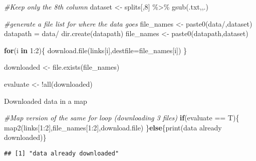 \documentclass[
]{book}
\newenvironment{Shaded}{\begin{snugshade}}{\end{snugshade}}
\newcommand{\AttributeTok}[1]{\textcolor[rgb]{0.77,0.63,0.00}{#1}}
\newcommand{\CommentTok}[1]{\textcolor[rgb]{0.56,0.35,0.01}{\textit{#1}}}
\newcommand{\ControlFlowTok}[1]{\textcolor[rgb]{0.13,0.29,0.53}{\textbf{#1}}}
\newcommand{\DecValTok}[1]{\textcolor[rgb]{0.00,0.00,0.81}{#1}}
\newcommand{\FunctionTok}[1]{\textcolor[rgb]{0.00,0.00,0.00}{#1}}
\newcommand{\NormalTok}[1]{#1}
\newcommand{\OtherTok}[1]{\textcolor[rgb]{0.56,0.35,0.01}{#1}}
\newcommand{\SpecialCharTok}[1]{\textcolor[rgb]{0.00,0.00,0.00}{#1}}
\newcommand{\StringTok}[1]{\textcolor[rgb]{0.31,0.60,0.02}{#1}}
\begin{document}
\begin{Shaded}
\begin{Highlighting}[]
\CommentTok{\#Keep only the 8th column}
\NormalTok{dataset }\OtherTok{\textless{}{-}}\NormalTok{ splits[,}\DecValTok{8}\NormalTok{] }\SpecialCharTok{\%\textgreater{}\%}
  \FunctionTok{gsub}\NormalTok{(}\StringTok{\textquotesingle{}.txt\textquotesingle{}}\NormalTok{,}\StringTok{\textquotesingle{}\textquotesingle{}}\NormalTok{,.)}

\CommentTok{\#generate a file list for where the data goes}
\NormalTok{file\_names }\OtherTok{\textless{}{-}} \FunctionTok{paste0}\NormalTok{(}\StringTok{\textquotesingle{}data/\textquotesingle{}}\NormalTok{,dataset)}
\NormalTok{datapath }\OtherTok{=} \StringTok{\textquotesingle{}data/\textquotesingle{}}
\FunctionTok{dir.create}\NormalTok{(datapath)}
\NormalTok{file\_names }\OtherTok{\textless{}{-}} \FunctionTok{paste0}\NormalTok{(datapath,dataset)}

\ControlFlowTok{for}\NormalTok{(i }\ControlFlowTok{in} \DecValTok{1}\SpecialCharTok{:}\DecValTok{2}\NormalTok{)\{}
  \FunctionTok{download.file}\NormalTok{(links[i],}\AttributeTok{destfile=}\NormalTok{file\_names[i])}
\NormalTok{\}}

\NormalTok{downloaded }\OtherTok{\textless{}{-}} \FunctionTok{file.exists}\NormalTok{(file\_names)}

\NormalTok{evaluate }\OtherTok{\textless{}{-}} \SpecialCharTok{!}\FunctionTok{all}\NormalTok{(downloaded)}
\end{Highlighting}
\end{Shaded}

Downloaded data in a map

\begin{Shaded}
\begin{Highlighting}[]
\CommentTok{\#Map version of the same for loop (downloading 3 files)}
\ControlFlowTok{if}\NormalTok{(evaluate }\SpecialCharTok{==}\NormalTok{ T)\{}
  \FunctionTok{map2}\NormalTok{(links[}\DecValTok{1}\SpecialCharTok{:}\DecValTok{2}\NormalTok{],file\_names[}\DecValTok{1}\SpecialCharTok{:}\DecValTok{2}\NormalTok{],download.file)}
\NormalTok{\}}\ControlFlowTok{else}\NormalTok{\{}\FunctionTok{print}\NormalTok{(}\StringTok{\textquotesingle{}data already downloaded\textquotesingle{}}\NormalTok{)\}}
\end{Highlighting}
\end{Shaded}

\begin{verbatim}
## [1] "data already downloaded"
\end{verbatim}
\end{document}
